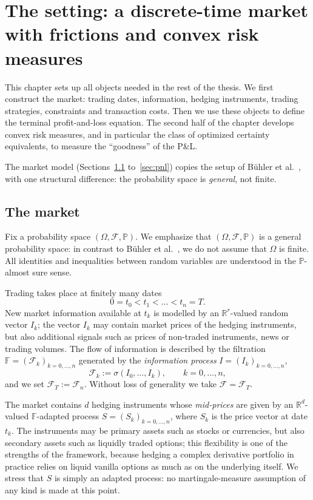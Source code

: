 \documentclass[11pt,a4paper]{report}
\numberwithin{equation}{chapter}
\theoremstyle{plain}
\theoremstyle{definition}
\newcommand{\PP}{\mathbb{P}}
\newcommand{\R}{\mathbb{R}}
\newcommand{\F}{\mathcal{F}}
\begin{document}
\setcounter{chapter}{1}

\chapter{The setting: a discrete-time market with frictions and convex risk measures}

This chapter sets up all objects needed in the rest of the thesis. We first construct the market: trading dates, information, hedging instruments, trading strategies, constraints and transaction costs. Then we use these objects to define the terminal profit-and-loss equation. The second half of the chapter develops convex risk measures, and in particular the class of optimized certainty equivalents, to measure the ``goodness'' of the P\&L.

The market model (Sections~\ref{sec:market} to~\ref{sec:pnl}) copies the setup of B\"uhler et al.\ \cite[Section~2]{buehler}, with one structural difference: the probability space is \emph{general}, not finite.

\section{The market}\label{sec:market}

Fix a probability space $(\Omega,\F,\PP)$. We emphasize that $(\Omega,\F,\PP)$ is a general probability space: in contrast to B\"uhler et al.\ \cite{buehler}, we do not assume that $\Omega$ is finite. All identities and inequalities between random variables are understood in the $\PP$-almost sure sense.

Trading takes place at finitely many dates
\[
    0=t_0<t_1<\dots<t_n=T.
\]
New market information available at $t_k$ is modelled by an $\R^r$-valued random vector $I_k$; the vector $I_k$ may contain market prices of the hedging instruments, but also additional signals such as prices of non-traded instruments, news or trading volumes. The flow of information is described by the filtration $\mathbb{F}=(\F_k)_{k=0,\dots,n}$ generated by the \emph{information process} $I=(I_k)_{k=0,\dots,n}$,
\[
    \F_k:=\sigma(I_0,\dots,I_k),\qquad k=0,\dots,n,
\]
and we set $\F_T:=\F_n$. Without loss of generality we take $\F=\F_T$.

The market contains $d$ hedging instruments whose \emph{mid-prices} are given by an $\R^d$-valued $\mathbb{F}$-adapted process $S=(S_k)_{k=0,\dots,n}$, where $S_k$ is the price vector at date $t_k$. The instruments may be primary assets such as stocks or currencies, but also secondary assets such as liquidly traded options; this flexibility is one of the strengths of the framework, because hedging a complex derivative portfolio in practice relies on liquid vanilla options as much as on the underlying itself. We stress that $S$ is simply an adapted process: no martingale-measure assumption of any kind is made at this point.
\end{document}
